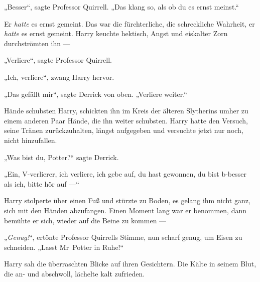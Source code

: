 „Besser“, sagte Professor Quirrell.
„Das klang so, als ob du es ernst meinst.“

Er \emph{hatte} es ernst gemeint. Das war die fürchterliche, die schreckliche Wahrheit, er \emph{hatte} es ernst gemeint. Harry keuchte hektisch, Angst und eiskalter Zorn durchströmten ihn —

„Verliere“, sagte Professor Quirrell.

„Ich, verliere“, zwang Harry hervor.

„Das gefällt mir“, sagte Derrick von oben.
„Verliere weiter.“

\later

Hände schubsten Harry, schickten ihn im Kreis der älteren Slytherins umher zu einem anderen Paar Hände, die ihn weiter schubsten. Harry hatte den Versuch, seine Tränen zurückzuhalten, längst aufgegeben und versuchte jetzt nur noch, nicht hinzufallen.

„Was bist du, Potter?“ sagte Derrick.

„Ein, V-verlierer, ich verliere, ich gebe auf, du hast gewonnen, du bist b-besser als ich, bitte hör auf —“

Harry stolperte über einen Fuß und stürzte zu Boden, es gelang ihm nicht ganz, sich mit den Händen abzufangen. Einen Moment lang war er benommen, dann bemühte er sich, wieder auf die Beine zu kommen —

„\emph{Genug!}“, ertönte Professor Quirrells Stimme, nun scharf genug, um Eisen zu schneiden.
„Lasst Mr~Potter in Ruhe!“

Harry sah die überraschten Blicke auf ihren Gesichtern. Die Kälte in seinem Blut, die an- und abschwoll, lächelte kalt zufrieden.

